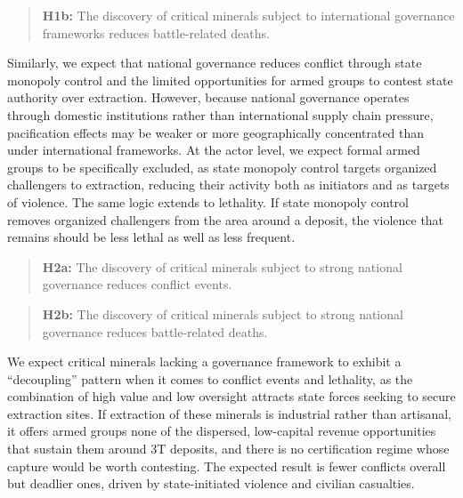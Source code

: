 \documentclass[11pt]{article}
\begin{document}
\begin{quote}
\textbf{H1b:} The discovery of critical minerals subject to international governance frameworks reduces battle-related deaths.
\end{quote}

Similarly, we expect that national governance reduces conflict through state monopoly control and the limited opportunities for armed groups to contest state authority over extraction. However, because national governance operates through domestic institutions rather than international supply chain pressure, pacification effects may be weaker or more geographically concentrated than under international frameworks. At the actor level, we expect formal armed groups to be specifically excluded, as state monopoly control targets organized challengers to extraction, reducing their activity both as initiators and as targets of violence. The same logic extends to lethality. If state monopoly control removes organized challengers from the area around a deposit, the violence that remains should be less lethal as well as less frequent.

\begin{quote}
\textbf{H2a:} The discovery of critical minerals subject to strong national governance reduces conflict events.
\end{quote}

\begin{quote}
\textbf{H2b:} The discovery of critical minerals subject to strong national governance reduces battle-related deaths.
\end{quote}



We expect critical minerals lacking a governance framework to exhibit a ``decoupling'' pattern when it comes to conflict events and lethality, as the combination of high value and low oversight attracts state forces seeking to secure extraction sites. If extraction of these minerals is industrial rather than artisanal, it offers armed groups none of the dispersed, low-capital revenue opportunities that sustain them around 3T deposits, and there is no certification regime whose capture would be worth contesting. The expected result is fewer conflicts overall but deadlier ones, driven by state-initiated violence and civilian casualties.
\end{document}
